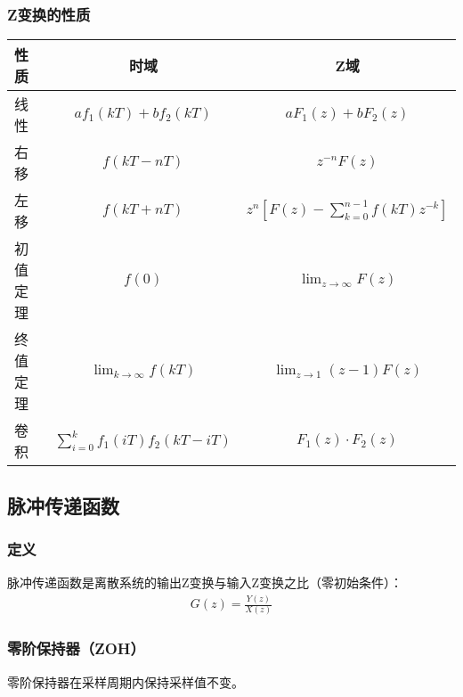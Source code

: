 \subsubsection{Z变换的性质}

\begin{center}
\begin{tabular}{|l|c|c|}
\hline
\textbf{性质} & \textbf{时域} & \textbf{Z域} \\
\hline
线性 & $a f_1(kT) + b f_2(kT)$ & $a F_1(z) + b F_2(z)$ \\
\hline
右移 & $f(kT - nT)$ & $z^{-n} F(z)$ \\
\hline
左移 & $f(kT + nT)$ & $z^n [F(z) - \sum_{k=0}^{n-1} f(kT) z^{-k}]$ \\
\hline
初值定理 & $f(0)$ & $\lim_{z\to\infty} F(z)$ \\
\hline
终值定理 & $\lim_{k\to\infty} f(kT)$ & $\lim_{z\to 1} (z-1)F(z)$ \\
\hline
卷积 & $\sum_{i=0}^k f_1(iT) f_2(kT-iT)$ & $F_1(z) \cdot F_2(z)$ \\
\hline
\end{tabular}
\end{center}

\subsection{脉冲传递函数}

\subsubsection{定义}

脉冲传递函数是离散系统的输出Z变换与输入Z变换之比（零初始条件）：
\begin{align*}
G(z) = \frac{Y(z)}{X(z)}
\end{align*}

\subsubsection{零阶保持器（ZOH）}

零阶保持器在采样周期内保持采样值不变。

